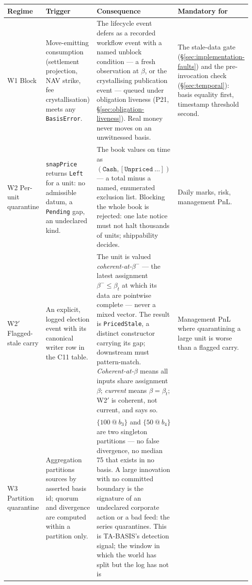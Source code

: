 \documentclass[11pt,a4paper]{article}
\begin{document}
\renewcommand{\arraystretch}{1.25}
\begin{center}
\begin{longtable}{@{}p{2.2cm} p{3.6cm} p{4.7cm} p{2.9cm}@{}}
\toprule
\textbf{Regime} & \textbf{Trigger} & \textbf{Consequence} & \textbf{Mandatory for} \\
\midrule
\endhead
W1 Block & Move-emitting consumption (settlement projection, NAV strike, fee
crystallisation) meets any \texttt{BasisError}. & The lifecycle event defers as a
recorded workflow event with a named unblock condition --- a fresh observation at
$\beta$, or the crystallising publication event --- queued under obligation liveness
(P21, \S\ref{sec:obligation-liveness}). Real money never moves on an unwitnessed basis.
& The stale-data gate (\S\ref{sec:implementation-faults}) and the pre-invocation check
(\S\ref{sec:temporal}): basis equality first, timestamp threshold second. \\
\addlinespace
W2 Per-unit quarantine & \texttt{snapPrice} returns \texttt{Left} for a unit: no
admissible datum, a \texttt{Pending} gap, an undeclared kind. & The book values on time
as $(\texttt{Cash},[\texttt{Unpriced}\ \dots])$ --- a total minus a named, enumerated
exclusion list. Blocking the whole book is rejected: one late notice must not halt
thousands of units; shippability decides. & Daily marks, risk, management PnL. \\
\addlinespace
W2$'$ Flagged-stale carry & An explicit, logged election event with its canonical
writer row in the C11 table. & The unit is valued \emph{coherent-at-}$\beta^-$ --- the
latest assignment $\beta^-\le\beta_t$ at which its data are pointwise complete --- never
a mixed vector. The result is \texttt{PricedStale}, a distinct constructor carrying its
gap; downstream must pattern-match. \emph{Coherent-at-}$\beta$ means all inputs share
assignment $\beta$; \emph{current} means $\beta=\beta_t$; W2$'$ is coherent, not
current, and says so. & Management PnL where quarantining a large unit is worse than a
flagged carry. \\
\addlinespace
W3 Partition quarantine & Aggregation partitions sources by asserted basis id;
quorum and divergence are computed within a partition only. & $\{100\ @\ b_3\}$ and
$\{50\ @\ b_4\}$ are two singleton partitions --- no false divergence, no median 75 that
exists in no basis. A large innovation with no committed boundary is the signature of an
undeclared corporate action or a bad feed: the series quarantines. This is TA-BASIS's
detection signal; the window in which the world has split but the log has not is

\end{longtable}
\end{center}
\end{document}
